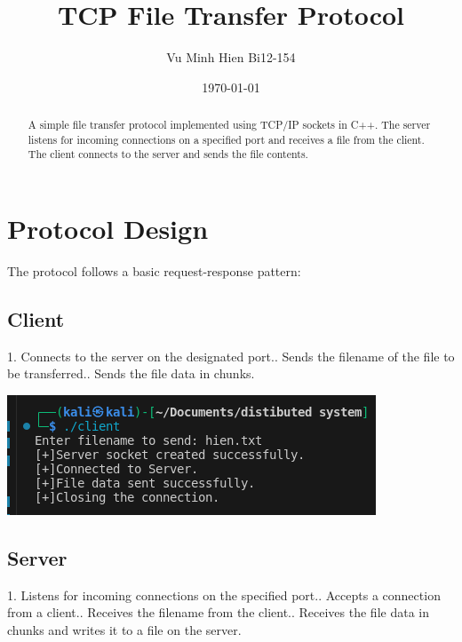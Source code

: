 \documentclass{article}
\begin{document}
\title{TCP File Transfer Protocol}
\author{Vu Minh Hien Bi12-154}
\date{\today}

\maketitle

\begin{abstract}
A simple file transfer protocol implemented using TCP/IP sockets in C++. The server listens for incoming connections on a specified port and receives a file from the client. The client connects to the server and sends the file contents.
\end{abstract}

\section{Protocol Design}

The protocol follows a basic request-response pattern:

\subsection{Client}

1. Connects to the server on the designated port.. Sends the filename of the file to be transferred.. Sends the file data in chunks.\newline 

\includegraphics[width=1\linewidth]{image2.png}
\subsection{Server}

1. Listens for incoming connections on the specified port.. Accepts a connection from a client.. Receives the filename from the client.. Receives the file data in chunks and writes it to a file on the server.\newline 
\end{document}
